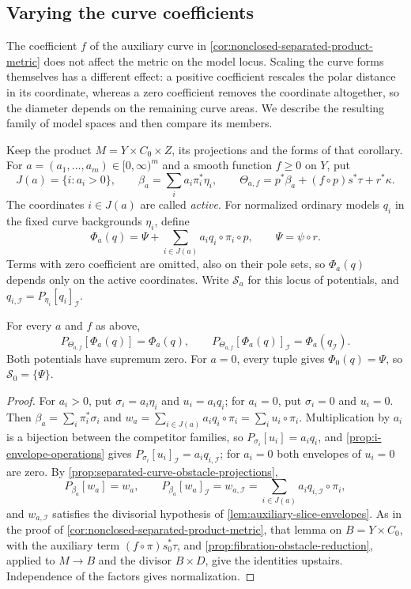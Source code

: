 \subsection{Varying the curve coefficients}
\label{subsec:weighted-curve-product-models}

The coefficient $f$ of the auxiliary curve in \cref{cor:nonclosed-separated-product-metric} does not affect the metric on the model locus. Scaling the curve forms themselves has a different effect: a positive coefficient rescales the polar distance in its coordinate, whereas a zero coefficient removes the coordinate altogether, so the diameter depends on the remaining curve areas. We describe the resulting family of model spaces and then compare its members.

Keep the product $M=Y\times C_0\times Z$, its projections and the forms of that corollary. For $a=(a_1,\ldots,a_m)\in[0,\infty)^m$ and a smooth function $f\geq0$ on $Y$, put
\[
 J(a)=\{i:a_i>0\},\qquad
 \beta_a=\sum_i a_i\pi_i^*\eta_i,\qquad
 \Theta_{a,f}=p^*\beta_a+(f\circ p)s^*\tau+r^*\kappa.
\]
The coordinates $i\in J(a)$ are called \emph{active}. For normalized ordinary models $q_i$ in the fixed curve backgrounds $\eta_i$, define
\[
 \Phi_a(q)=\Psi+\sum_{i\in J(a)}a_iq_i\circ\pi_i\circ p,
 \qquad \Psi=\psi\circ r.
\]
Terms with zero coefficient are omitted, also on their pole sets, so $\Phi_a(q)$ depends only on the active coordinates. Write $\mathcal S_a$ for this locus of potentials, and $q_{i,\mathcal I}=P_{\eta_i}[q_i]_{\mathcal I}$.

\begin{lemma}\label{lem:weighted-product-model-projections}
For every $a$ and $f$ as above,
\[
 P_{\Theta_{a,f}}[\Phi_a(q)]=\Phi_a(q),\qquad
 P_{\Theta_{a,f}}[\Phi_a(q)]_{\mathcal I}=\Phi_a(q_{\mathcal I}).
\]
Both potentials have supremum zero. For $a=0$, every tuple gives $\Phi_0(q)=\Psi$, so $\mathcal S_0=\{\Psi\}$.
\end{lemma}
\begin{proof}
For $a_i>0$, put $\sigma_i=a_i\eta_i$ and $u_i=a_iq_i$; for $a_i=0$, put $\sigma_i=0$ and $u_i=0$. Then $\beta_a=\sum_i\pi_i^*\sigma_i$ and $w_a=\sum_{i\in J(a)}a_iq_i\circ\pi_i=\sum_iu_i\circ\pi_i$. Multiplication by $a_i$ is a bijection between the competitor families, so $P_{\sigma_i}[u_i]=a_iq_i$, and \cref{prop:i-envelope-operations} gives $P_{\sigma_i}[u_i]_{\mathcal I}=a_iq_{i,\mathcal I}$; for $a_i=0$ both envelopes of $u_i=0$ are zero. By \cref{prop:separated-curve-obstacle-projections},
\[
 P_{\beta_a}[w_a]=w_a,\qquad
 P_{\beta_a}[w_a]_{\mathcal I}=w_{a,\mathcal I}=\sum_{i\in J(a)}a_iq_{i,\mathcal I}\circ\pi_i,
\]
and $w_{a,\mathcal I}$ satisfies the divisorial hypothesis of \cref{lem:auxiliary-slice-envelopes}. As in the proof of \cref{cor:nonclosed-separated-product-metric}, that lemma on $B=Y\times C_0$, with the auxiliary term $(f\circ\pi)s_0^*\tau$, and \cref{prop:fibration-obstacle-reduction}, applied to $M\to B$ and the divisor $B\times D$, give the identities upstairs. Independence of the factors gives normalization.
\end{proof}

